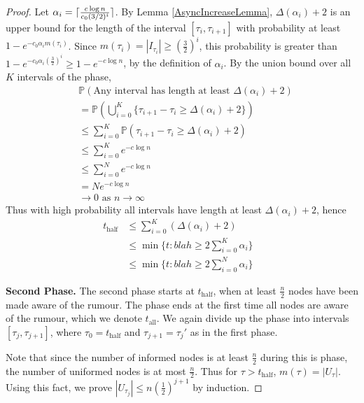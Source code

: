 \documentclass[a4paper,11pt]{article}
\theoremstyle{definition}
\DeclarePairedDelimiter\ceil{\lceil}{\rceil}
\begin{document}
\begin{proof}
	Let $\alpha_i = \ceil{\frac{c \log n}{c_0 (3/2)^i}}$. %
	By Lemma \ref{AsyncIncreaseLemma}, $\Delta(\alpha_i) + 2$ is an upper bound for the length of the interval $[\tau_i, \tau_{i+1}]$ 
	with probability at least $1 - e^{-c_0\alpha_i m(\tau_i)}$. %
	Since $m(\tau_i) = |I_{\tau_i}| \geq (\frac{3}{2})^i$, this probability is greater than $1 - e^{-c_0\alpha_i (\frac{3}{2})^i} \geq 1 - e^{-c \log n}$, by the definition of $\alpha_i$. By the union bound over all $K$ intervals of the phase,
	\begin{align*}
		& \mathbb{P}(\text{Any interval has length at least } \Delta(\alpha_i) + 2) \\
		&= \mathbb{P}(\bigcup_{i=0}^K \{\tau_{i+1} - \tau_i \geq \Delta(\alpha_i) + 2\}) \\
		&\leq \sum_{i=0}^K \mathbb{P}(\tau_{i+1} - \tau_i \geq \Delta(\alpha_i) + 2) \\
		&\leq \sum_{i=0}^K e^{-c \log n} \\
		&\leq \sum_{i=0}^N e^{-c \log n} 
		\\
		&= N e^{-c \log n} \\
		&\to 0 \text { as } n \to \infty
	\end{align*}
	Thus with high probability all intervals have length at least $\Delta(\alpha_i) + 2$, hence
	\begin{align*}
		t_\text{half} &\leq \sum_{i=0}^K (\Delta(\alpha_i) + 2) \\
		&\leq \min \{t : blah \geq 2 \sum_{i=0}^K \alpha_i \} \\ %
		&\leq \min \{t : blah \geq 2 \sum_{i=0}^N \alpha_i \} & %
	\end{align*}

	\textbf{Second Phase.} The second phase starts at $t_\text{half}$, when at least $\frac{n}{2}$ nodes have been made aware of the rumour. The phase ends at the first time all nodes are aware of the rumour, which we denote $t_\text{all}$. We again divide up the phase into intervals $[\tau_j, \tau_{j+1}]$, where $\tau_0 = t_\text{half}$ and $\tau_{j+1} = \tau_j'$ as in the first phase.

	Note that since the number of informed nodes is at least $\frac{n}{2}$ during this is phase, the number of uniformed nodes is at most $\frac{n}{2}$. Thus for $\tau > t_\text{half}$, $m(\tau) = |U_\tau|$. Using this fact, we prove $|U_{\tau_j}| \leq n(\frac{1}{2})^{j+1}$ by induction.


\end{proof}
\end{document}
